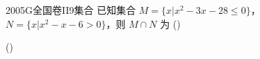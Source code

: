 
\begin{problem}{2005}{G}{全国卷II}{9}{集合}
已知集合 $ M=\{x|x^2-3x-28\leqslant 0\} $，$ N=\{x|x^2-x-6>0\} $，则 $ M\cap N $ 为 (\hspace{1cm})

(\hspace{1cm})
\begin{choices}
\end{choices}
\end{problem}

\begin{answer}

\end{answer}

\begin{solutions}

\end{solutions}